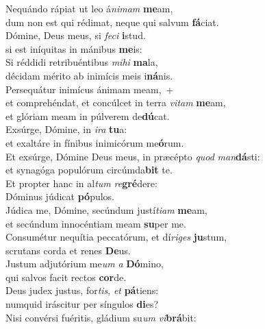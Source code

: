 \evenverse Nequándo rápiat ut leo á\textit{ni}\textit{mam} \textbf{me}am,~\*\\
\evenverse dum non est qui rédimat, neque qui salvum \textbf{fá}ciat.\\
\oddverse Dómine, Deus meus, si \textit{fe}\textit{ci} \textbf{i}stud.~\*\\
\oddverse si est iníquitas in mánibus \textbf{me}is:\\
\evenverse Si réddidi retribuéntibus \textit{mi}\textit{hi} \textbf{ma}la,~\*\\
\evenverse décidam mérito ab inimícis meis i\textbf{ná}nis.\\
\oddverse Persequátur inimícus ánimam meam,~+\\
\oddverse  et comprehéndat, et concúlcet in terra \textit{vi}\textit{tam} \textbf{me}am,~\*\\
\oddverse et glóriam meam in púlverem de\textbf{dú}cat.\\
\evenverse Exsúrge, Dómine, in \textit{i}\textit{ra} \textbf{tu}a:~\*\\
\evenverse et exaltáre in fínibus inimicórum me\textbf{ó}rum.\\
\oddverse Et exsúrge, Dómine Deus meus, in præcépto \textit{quod} \textit{man}\textbf{dá}sti:~\*\\
\oddverse et synagóga populórum circúmda\textbf{bit} te.\\
\evenverse Et propter hanc in al\textit{tum} \textit{re}\textbf{gré}dere:~\*\\
\evenverse Dóminus júdicat \textbf{pó}pulos.\\
\oddverse Júdica me, Dómine, secúndum justí\textit{ti}\textit{am} \textbf{me}am,~\*\\
\oddverse et secúndum innocéntiam meam \textbf{su}per me.\\
\evenverse Consumétur nequítia peccatórum, et dí\textit{ri}\textit{ges} \textbf{ju}stum,~\*\\
\evenverse scrutans corda et renes \textbf{De}us.\\
\oddverse Justum adjutórium me\textit{um} \textit{a} \textbf{Dó}mino,~\*\\
\oddverse qui salvos facit rectos \textbf{cor}de.\\
\evenverse Deus judex justus, for\textit{tis}, \textit{et} \textbf{pá}tiens:~\*\\
\evenverse numquid iráscitur per síngulos \textbf{di}es?\\
\oddverse Nisi convérsi fuéritis, gládium su\textit{um} \textit{vi}\textbf{brá}bit:~\*\\
